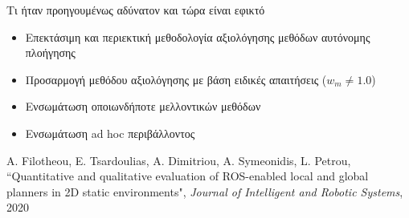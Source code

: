 \begin{frame}{Τι ήταν προηγουμένως αδύνατον και τώρα είναι εφικτό}

  \vspace{2cm}
  \begin{itemize}
    \item Επεκτάσιμη και περιεκτική μεθοδολογία αξιολόγησης μεθόδων αυτόνομης πλοήγησης
    \item Προσαρμογή μεθόδου αξιολόγησης με βάση ειδικές απαιτήσεις ($w_m \neq 1.0$)
    \item Ενσωμάτωση οποιωνδήποτε μελλοντικών μεθόδων
    \item Ενσωμάτωση ad hoc περιβάλλοντος
  \end{itemize}

\placebottom
  \tiny A. Filotheou, E. Tsardoulias, A. Dimitriou, A. Symeonidis, L. Petrou, ``Quantitative and qualitative evaluation of ROS-enabled local and global planners in 2D static environments",  \textit{Journal of Intelligent and Robotic Systems}, 2020
\end{frame}
